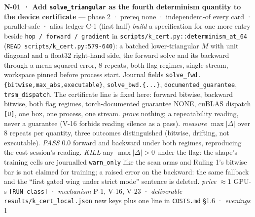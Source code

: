 \documentclass[11pt,a4paper]{article}
\newcounter{none}                 %
\theoremstyle{plain}
\theoremstyle{definition}
\theoremstyle{remark}
\begin{document}
\textbf{N-01 · Add \texttt{solve\_triangular} as the fourth determinism
quantity to the device certificate} --- phase 2 · prereq none ·
independent-of every card · parallel-safe · alias ledger C-1 (first
half) \emph{build} a specification for one more entry beside
\texttt{hop\ /\ forward\ /\ gradient} in
\texttt{scripts/k\_cert.py::determinism\_at\_64}
(\texttt{READ\ scripts/k\_cert.py:579-640}): a batched lower-triangular
\(M\) with unit diagonal and a float32 right-hand side, the forward
solve and its backward through a mean-squared error, 8 repeats, both
flag regimes, single stream, workspace pinned before process start.
Journal fields \texttt{solve\_fwd.\{bitwise,max\_abs,executable\}},
\texttt{solve\_bwd.\{...\}}, \texttt{documented\_guarantee},
\texttt{trsm\_dispatch}. The certificate line is fixed here: forward
bitwise, backward bitwise, both flag regimes, torch-documented guarantee
NONE, cuBLAS dispatch \texttt{{[}U{]}}, one box, one process, one
stream. \emph{prove} nothing; a repeatability reading, never a guarantee
(V-16 forbids reading silence as a pass). \emph{measure}
\(\max|\Delta|\) over 8 repeats per quantity, three outcomes
distinguished (bitwise, drifting, not executable). \emph{PASS} \(0.0\)
forward and backward under both regimes, reproducing the cost session's
reading. \emph{KILL} any \(\max|\Delta|>0\) under the flag: the shape's
training cells are journalled \texttt{warn\_only} like the scan arms and
Ruling 1's bitwise bar is not claimed for training; a raised error on
the backward: the same fallback and the ``first gated wing under strict
mode'' sentence is deleted. \emph{price} \(\approx1\) GPU-s
\texttt{{[}RUN\ class{]}} · \emph{mechanism} P-1, V-16, V-23 ·
\emph{deliverable} \texttt{results/k\_cert\_local.json} new keys plus
one line in \texttt{COSTS.md} §1.6 · \emph{evenings} 1
\end{document}
